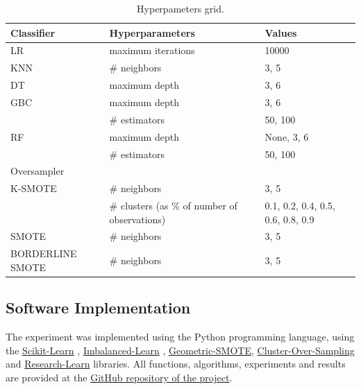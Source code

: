 \documentclass[parskip=full]{scrartcl}
\begin{document}
\begin{table}[H]
	\centering
	\begin{tabular}{lll}
		\toprule
		Classifier       & Hyperparameters      & Values                            \\
		\hline
		LR               & maximum iterations   & 10000                             \\
		KNN              & \# neighbors  & {3, 5}                            \\
		DT               & maximum depth        & {3, 6}                            \\
		GBC              & maximum depth        & {3, 6}                            \\
		                 & \# estimators & {50, 100}                         \\
		RF               & maximum depth        & {None, 3, 6}                      \\
		                 & \# estimators & {50, 100}                         \\
		\toprule
		Oversampler      &                      &                                   \\
		\hline
		K-SMOTE          & \# neighbors  & {3, 5}                            \\
		                 & \# clusters (as \% of number of observations)   & {0.1, 0.2, 0.4, 0.5, 0.6, 0.8, 0.9}      \\
		SMOTE            & \# neighbors  & {3, 5}                            \\
		BORDERLINE SMOTE & \# neighbors  & {3, 5}                            \\
		\bottomrule
	\end{tabular}
	\caption{\label{tab:grid}Hyperpameters grid.}
\end{table}

\subsection{Software Implementation}
The experiment was implemented using the Python programming language, using the
\href{https://scikit-learn.org/stable/}{Scikit-Learn} \cite{Pedregosa2011}, \href{https://imbalanced-learn.org/en/stable/}{Imbalanced-Learn}
\cite{JMLR:v18:16-365}, \href{https://geometric-smote.readthedocs.io/en/latest/?badge=latest}{Geometric-SMOTE}, \href{https://cluster-over-sampling.readthedocs.io/en/latest/?badge=latest}{Cluster-Over-Sampling} and
\href{https://research-learn.readthedocs.io/en/latest/?badge=latest}{Research-Learn} libraries. All functions, algorithms, experiments and
results are provided at the \href{https://github.com/joaopfonseca/publications/tree/master/remote-sensing-kmeans-
	smote}{GitHub repository of the project}.
\end{document}
